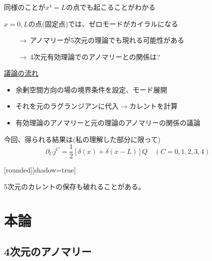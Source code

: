 \documentclass[
  unicode,a4paper,9pt,
  xcolor = {dvipsnames,svgnames},
  hyperref ={colorlinks=true,citecolor=Navy,linkcolor=NavyBlue,urlcolor=purple},
  ja=standard,lualatex
]{beamer}
\begin{document}
\begin{frame}
  \frametitle{\subsecname}

  同様のことが$x^{4}=L$の点でも起こることがわかる

  \vspace*{5pt}

  $x=0,L$の点(固定点)では、ゼロモードがカイラルになる

  $\qquad\rightarrow\ $アノマリーが5次元の理論でも現れる可能性がある

  $\qquad\rightarrow\ $4次元有効理論でのアノマリーとの関係は?

  \pause
  \vspace*{5pt}

  \uline{議論の流れ}

  \begin{itemize}
    \item 
    余剰空間方向の場の境界条件を設定、モード展開
    \item 
    それを元のラグランジアンに代入$\rightarrow$カレントを計算
    \item 
    有効理論のアノマリーと元の理論のアノマリーの関係の議論
  \end{itemize}

  \vspace*{5pt}

  今回、得られる結果は(私の理解した部分に限って)
  \begin{equation*}
    \partial_{C}j^{C}
    =
    \frac{1}{2}\left[ \delta(x)+\delta(x-L) \right]Q
    \quad
    (C=0,1,2,3,4)
  \end{equation*}

  [rounded][shadow=true]
  \begin{block}{}
    \centering
    5次元のカレントの保存も破れることがある。
  \end{block}

\end{frame}


\section{本論}

\begin{frame}[plain]
  \huge \secname
\end{frame}

\subsection{4次元のアノマリー}
\end{document}
